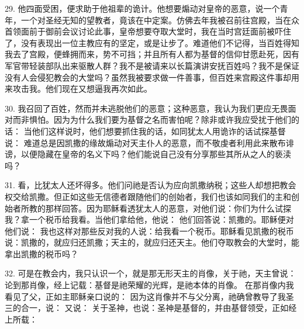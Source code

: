 29. 他四面受困，便求助于他祖辈的诡计。他想要煽动对皇帝的恶意，说一个青年，一个对圣经无知的望教者，竟该在中定案。仿佛去年我被召前往宫殿，当在众首领面前于御前会议讨论此事，皇帝想要夺取大堂时，我在当时宫廷面前被吓住了，没有表现出一位主教应有的坚定，或是让步了。难道他们不记得，当百姓得知我去了宫殿，便蜂拥而来，势不可挡；并且所有人都为基督的信仰甘愿赴死，因有军官带轻装部队出来驱散人群？我不是被请来以长篇演讲安抚百姓吗？我不是保证没有人会侵犯教会的大堂吗？虽然我被要求做一件善事，但百姓来宫殿这件事却用来攻击我。他们现在又想逼我再次如此。\par

30. 我召回了百姓，然而并未逃脱他们的恶意；这种恶意，我认为我们更应无畏面对而非惧怕。因为为什么我们要为基督之名而害怕呢？除非或许我应受扰于他们的话： 当他们这样说时，他们想要抓住我的话，如同犹太人用诡诈的话试探基督说：  难道总是因凯撒的缘故煽动对天主仆人的恶意，而不敬虔者利用此来散布诽谤，以便隐藏在皇帝的名义下吗？他们能说自己没有分享那些其所从之人的亵渎吗？\par

31. 看，比犹太人还坏得多。他们问祂是否认为应向凯撒纳税；这些人却想把教会权交给凯撒。但正如这些无信德者跟随他们的创始者，我们也该如同我们的主和创始者所教的那样回答。因为耶稣看透犹太人的恶意，对他们说：你们为什么试探我？拿一个税币给我看。当他们拿给他，他说：  他们回答说：凯撒的。耶稣便对他们说：  我也这样对那些反对我的人说：给我看一个税币。耶稣看见凯撒的税币说：凯撒的，就应归还凯撒；天主的，就应归还天主。他们夺取教会的大堂时，能拿出凯撒的税币吗？\par

32. 可是在教会内，我只认识一个，就是那无形天主的肖像，关于祂，天主曾说：  论到那肖像，经上记载：基督是祂荣耀的光辉，是祂本体的肖像。  在那肖像内我看见了父，正如主耶稣亲口说的：  因为这肖像并不与父分离，祂确曾教导了我圣三的合一，说：  又说：  关于圣神，也说：圣神是基督的，并由基督领受，正如经上所载： \par

